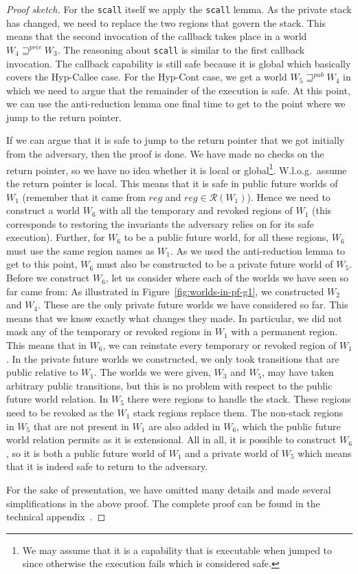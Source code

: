 \documentclass[format=acmsmall, review=true, screen=true]{acmart}
\renewcommand{\figurename}{Figure}
\newcommand{\var}[1]{\mathit{#1}}
\newcommand{\reg}{\var{reg}}
\newcommand{\futurewk}{\mathbin{\sqsupseteq}^{\var{pub}}}
\newcommand{\futurestr}{\mathbin{\sqsupseteq}^{\var{priv}}}
\newcommand{\asmType}{\plaindom{AsmType}}
\newcommand{\plaindom}[1]{\mathrm{#1}}
\newcommand{\intr}[2]{\mathcal{#1}}
\newcommand{\regintr}[1]{\intr{R}{#1}}
\newcommand{\stdrr}{\regintr{\asmType}}
\newenvironment{toplas}{}{}
\begin{document}
\begin{toplas}
\begin{proof}[Proof sketch]
  For the \texttt{scall} itself we apply the \texttt{scall} lemma.
  As the private stack has changed, we need to replace the two regions that govern the stack.
  This means that the second invocation of the callback takes place in a world $W_4 \futurestr W_3$.
  The reasoning about \texttt{scall} is similar to the first callback invocation.
  The callback capability is still safe because it is global which basically covers the Hyp-Callee case.
  For the Hyp-Cont case, we get a world $W_5 \futurewk W_4$ in which we need to argue that the remainder of the execution is safe.
  At this point, we can use the anti-reduction lemma one final time to get to the point where we jump to the return pointer.
  
  If we can argue that it is safe to jump to the return pointer that we got initially from the adversary, then the proof is done.
  We have made no checks on the return pointer, so we have no idea whether it is local or global\footnote{We may assume that it is a capability that is executable when jumped to since otherwise the execution fails which is considered safe.}.
  W.l.o.g.\ assume the return pointer is local.
  This means that it is safe in public future worlds of $W_1$ (remember that it came from $\reg$ and $\reg \in \stdrr(W_1)$).
  Hence we need to construct a world $W_6$ with all the temporary and revoked regions of $W_1$ (this corresponds to restoring the invariants the adversary relies on for its safe execution).
  Further, for $W_6$ to be a public future world, for all these regions, $W_6$ must use the same region names as $W_1$. 
  As we used the anti-reduction lemma to get to this point, $W_6$ must also be constructed to be a private future world of $W_5$.
  Before we construct $W_6$, let us consider where each of the worlds we have seen so far came from: As illustrated in \figurename~\ref{fig:worlds-in-pf-g1}, we constructed $W_2$ and $W_4$.
  These are the only private future worlds we have considered so far.
  This means that we know exactly what changes they made.
  In particular, we did not mask any of the temporary or revoked regions in $W_1$ with a permanent region.
  This means that in $W_6$, we can reinstate every temporary or revoked region of $W_1$.
  In the private future worlds we constructed, we only took transitions that are
  public relative to $W_1$.
  The worlds we were given, $W_3$ and $W_5$, may have taken arbitrary public transitions, but this is no problem with respect to the public future world relation.
  In $W_5$ there were regions to handle the stack.
  These regions need to be revoked as the $W_1$ stack regions replace them.
  The non-stack regions in $W_5$ that are not present in $W_1$ are also added in $W_6$, which the public future world relation permits as it is extensional.
  All in all, it is possible to construct $W_6$, so it is both a public future world of $W_1$ and a private world of $W_5$ which means that it is indeed safe to return to the adversary.

  For the sake of presentation, we have omitted many details and made several simplifications in the above proof.
  The complete proof can be found in the technical appendix~\citep{technical_appendix}.
  \end{proof}
\end{toplas}
\end{document}
